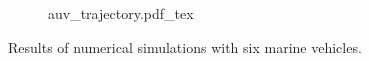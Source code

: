 \begin{figure}[t]
    \centering
    \begin{subfigure}[c]{0.9\textwidth}
        \centering
        \def\svgwidth{\textwidth}
        {auv_trajectory.pdf_tex}
        
    \end{subfigure}
    \vspace*{5mm}
    \begin{subfigure}[c]{0.9\textwidth}
        \centering        
        
        
    \end{subfigure}
    \vspace*{-8mm}
    \caption{Results of numerical simulations with six marine vehicles.}
    \label{fig:MPC_AUV_simulations}
    
\end{figure}

